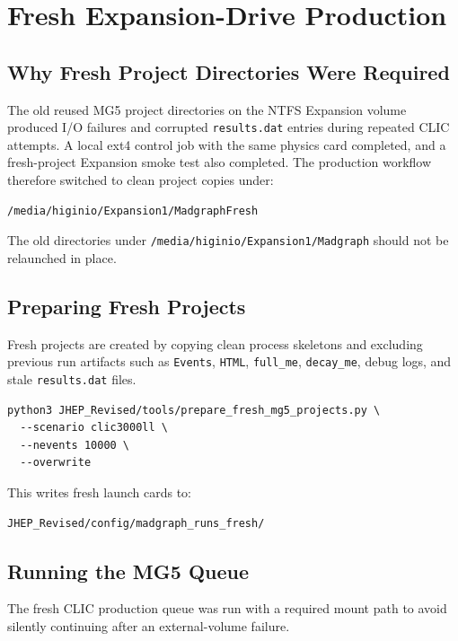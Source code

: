 \documentclass[11pt]{article}
\begin{document}
\section{Fresh Expansion-Drive Production}

\subsection{Why Fresh Project Directories Were Required}

The old reused MG5 project directories on the NTFS Expansion volume produced
I/O failures and corrupted \texttt{results.dat} entries during repeated CLIC
attempts.  A local ext4 control job with the same physics card completed, and a
fresh-project Expansion smoke test also completed.  The production workflow
therefore switched to clean project copies under:

\begin{lstlisting}
/media/higinio/Expansion1/MadgraphFresh
\end{lstlisting}

The old directories under \texttt{/media/higinio/Expansion1/Madgraph} should not
be relaunched in place.

\subsection{Preparing Fresh Projects}

Fresh projects are created by copying clean process skeletons and excluding
previous run artifacts such as \texttt{Events}, \texttt{HTML},
\texttt{full\_me}, \texttt{decay\_me}, debug logs, and stale
\texttt{results.dat} files.

\begin{lstlisting}
python3 JHEP_Revised/tools/prepare_fresh_mg5_projects.py \
  --scenario clic3000ll \
  --nevents 10000 \
  --overwrite
\end{lstlisting}

This writes fresh launch cards to:

\begin{lstlisting}
JHEP_Revised/config/madgraph_runs_fresh/
\end{lstlisting}

\subsection{Running the MG5 Queue}

The fresh CLIC production queue was run with a required mount path to avoid
silently continuing after an external-volume failure.
\end{document}
